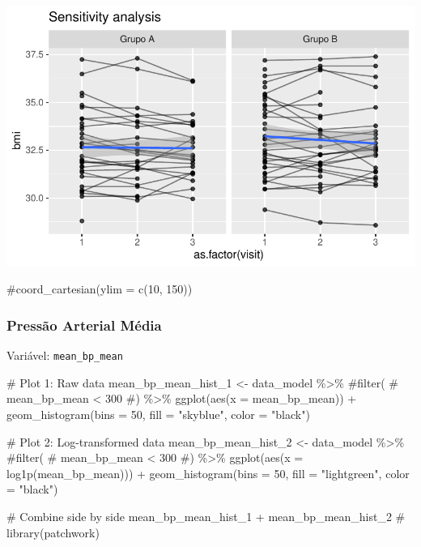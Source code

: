 \documentclass[
  letterpaper,
  DIV=11,
  numbers=noendperiod]{scrartcl}
\newenvironment{Shaded}{\begin{snugshade}}{\end{snugshade}}
\newcommand{\AttributeTok}[1]{\textcolor[rgb]{0.40,0.45,0.13}{#1}}
\newcommand{\CommentTok}[1]{\textcolor[rgb]{0.37,0.37,0.37}{#1}}
\newcommand{\DecValTok}[1]{\textcolor[rgb]{0.68,0.00,0.00}{#1}}
\newcommand{\FunctionTok}[1]{\textcolor[rgb]{0.28,0.35,0.67}{#1}}
\newcommand{\NormalTok}[1]{\textcolor[rgb]{0.00,0.23,0.31}{#1}}
\newcommand{\OtherTok}[1]{\textcolor[rgb]{0.00,0.23,0.31}{#1}}
\newcommand{\SpecialCharTok}[1]{\textcolor[rgb]{0.37,0.37,0.37}{#1}}
\newcommand{\StringTok}[1]{\textcolor[rgb]{0.13,0.47,0.30}{#1}}
\begin{document}
\includegraphics{Outcomes_V1V2V3_files/figure-pdf/bmi_6-2.pdf}

\begin{Shaded}
\begin{Highlighting}[]
    \CommentTok{\#coord\_cartesian(ylim = c(10, 150))}
\end{Highlighting}
\end{Shaded}

\subsubsection{Pressão Arterial
Média}\label{pressuxe3o-arterial-muxe9dia}

Variável: \texttt{mean\_bp\_mean}

\begin{Shaded}
\begin{Highlighting}[]
\CommentTok{\# Plot 1: Raw data}
\NormalTok{mean\_bp\_mean\_hist\_1 }\OtherTok{\textless{}{-}}\NormalTok{ data\_model }\SpecialCharTok{\%\textgreater{}\%} 
    \CommentTok{\#filter(}
    \CommentTok{\#    mean\_bp\_mean \textless{} 300}
    \CommentTok{\#) \%\textgreater{}\% }
    \FunctionTok{ggplot}\NormalTok{(}\FunctionTok{aes}\NormalTok{(}\AttributeTok{x =}\NormalTok{ mean\_bp\_mean)) }\SpecialCharTok{+} 
    \FunctionTok{geom\_histogram}\NormalTok{(}\AttributeTok{bins =} \DecValTok{50}\NormalTok{, }\AttributeTok{fill =} \StringTok{"skyblue"}\NormalTok{, }\AttributeTok{color =} \StringTok{"black"}\NormalTok{)}

\CommentTok{\# Plot 2: Log{-}transformed data}
\NormalTok{mean\_bp\_mean\_hist\_2 }\OtherTok{\textless{}{-}}\NormalTok{ data\_model }\SpecialCharTok{\%\textgreater{}\%} 
    \CommentTok{\#filter(}
    \CommentTok{\#    mean\_bp\_mean \textless{} 300}
    \CommentTok{\#) \%\textgreater{}\%}
    \FunctionTok{ggplot}\NormalTok{(}\FunctionTok{aes}\NormalTok{(}\AttributeTok{x =} \FunctionTok{log1p}\NormalTok{(mean\_bp\_mean))) }\SpecialCharTok{+} 
    \FunctionTok{geom\_histogram}\NormalTok{(}\AttributeTok{bins =} \DecValTok{50}\NormalTok{, }\AttributeTok{fill =} \StringTok{"lightgreen"}\NormalTok{, }\AttributeTok{color =} \StringTok{"black"}\NormalTok{)}

\CommentTok{\# Combine side by side}
\NormalTok{mean\_bp\_mean\_hist\_1 }\SpecialCharTok{+}\NormalTok{ mean\_bp\_mean\_hist\_2 }\CommentTok{\# library(patchwork)}
\end{Highlighting}
\end{Shaded}
\end{document}
